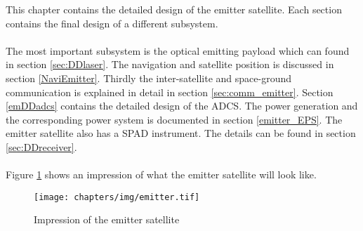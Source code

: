 This chapter contains the detailed design of the emitter satellite. Each section contains the final design of a different subsystem. 
\\\\
The most important subsystem is the optical emitting payload which can found in section \ref{sec:DDlaser}. The navigation and satellite position is discussed in section \ref{NaviEmitter}. Thirdly the inter-satellite and space-ground communication is explained in detail in section \ref{sec:comm_emitter}. Section \ref{emDDadcs} contains the detailed design of the \ac{ADCS}. The power generation and the corresponding power system is documented in section \ref{emitter_EPS}. The emitter satellite also has a \ac{SPAD} instrument. The details can be found in section \ref{sec:DDreceiver}.
\\\\
Figure \ref{fig:emitterSat} shows an impression of what the emitter satellite will look like.

\begin{figure}
\texttt{[image: chapters/img/emitter.tif]}
\caption{Impression of the emitter satellite}
\label{fig:emitterSat}
\end{figure}